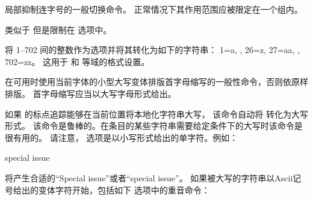 \begin{ltxsyntax}


局部抑制连字号的一般切换命令。
正常情况下其作用范围应被限定在一个组内。



类似于  但是限制在  选项中。



将 1--702 间的整数作为选项并将其转化为如下的字符串： 1=a, \textellipsis, 26=z, 27=aa, \textellipsis, 702=zz。
这用于  和  等域的格式设置。



在可用时使用当前字体的小型大写变体排版首字母缩写的一般性命令，否则依原样排版。
首字母缩写应当以大写字母形式给出。



如果 \biblatex 的标点追踪能够在当前位置将本地化字符串大写，
该命令自动将  转化为大写形式。
该命令是鲁棒的。在条目的某些字符串需要给定条件下的大写时该命令是很有用的。
请注意， 选项是以小写形式给出的单字符。例如：

\begin{ltxexample}
\autocap{s}pecial issue
\end{ltxexample}
%
将产生合适的“Special issue”或者“special issue”。
如果被大写的字符串以Ascii记号给出的变体字符开始，包括如下  选项中的重音命令：


\end{ltxsyntax}
